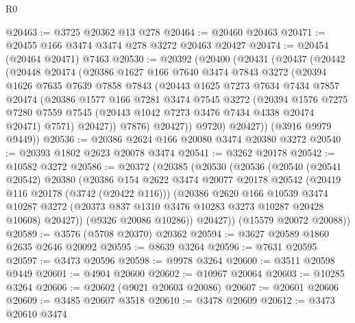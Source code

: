 \begin{lexlean}{R0}
\begin{coremodule}
@20463 := @3725 @20362 @13 @278
@20464 := @20460 @20463
@20471 := @20455 @166 @3474 @3474 @278 @3272 @20463 @20427
@20474 := @20454 (@20464 @20471) @7463
@20530 := @20392
    (@20400
      (@20431
        (@20437
          (@20442
            (@20448
              @20474
              (@20386
                @1627
                @166
                @7640
                @3474
                @7843
                @3272
                (@20394
                  @1626
                  @7635
                  @7639
                  @7858
                  @7843
                  (@20443
                    @1625
                    @7273
                    @7634
                    @7434
                    @7857
                    @20474
                    (@20386
                      @1577
                      @166
                      @7281
                      @3474
                      @7545
                      @3272
                      (@20394
                        @1576
                        @7275
                        @7280
                        @7559
                        @7545
                        (@20443 @1042 @7273 @3476 @7434 @4338 @20474 @20471)
                        @7571)
                      @20427))
                  @7876)
                @20427))
            @9720)
          @20427))
      (@3916 @9979 @9449))
@20536 := @20386 @2624 @166 @20080 @3474 @20380 @3272
@20540 := @20393 @1802 @2623 @20078 @3474
@20541 := @3262 @20178
@20542 := @10582 @3272
@20586 := @20372
    (@20385
      (@20530
        (@20536
          (@20540
            (@20541 @20542)
            @20380
            (@20386
              @154
              @2622
              @3474
              @20077
              @20178
              @20542
              (@20419 @116 @20178 (@3742 (@20422 @116)))
              (@20386
                @2620
                @166
                @10539
                @3474
                @10287
                @3272
                (@20373 @837 @1310 @3476 @10283 @3273 @10287 @20428 @10608)
                @20427))
            (@9326 @20086 @10286))
          @20427))
      (@15579 @20072 @20088))
@20589 := @3576 (@5708 @20370) @20362
@20594 := @3627 @20589 @1860 @2635 @2646 @20092
@20595 := @8639 @3264
@20596 := @7631 @20595
@20597 := @3473 @20596
@20598 := @9978 @3264
@20600 := @3511 @20598 @9449
@20601 := @4904 @20600
@20602 := @10967 @20064
@20603 := @10285 @3264
@20606 := @20602 (@9021 @20603 @20086)
@20607 := @20601 @20606
@20609 := @3485 @20607 @3518
@20610 := @3478 @20609
@20612 := @3473 @20610 @3474

\end{coremodule}
\end{lexlean}
